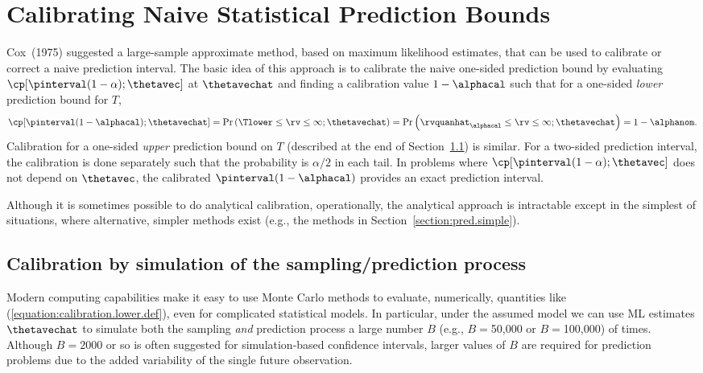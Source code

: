 \section{Calibrating Naive Statistical Prediction Bounds}
\label{section:calibrate.pred}
Cox~(1975) suggested a large-sample approximate method, based on
maximum likelihood estimates, that can be used to calibrate or
correct a naive prediction interval.  The basic idea of this
approach is to calibrate the naive one-sided prediction bound by
evaluating $\cp[\pinterval(1-\alpha) ;\thetavec]$ at $\thetavechat$
and finding a calibration value $1-\alphacal$ such that for a
one-sided {\em lower} prediction bound for $T$,
\begin{equation}
\label{equation:calibration.lower.def}
\cp[\pinterval(1-\alphacal) ;\thetavechat] =
\Pr \left(\Tlower \leq \rv \leq \infty ; \thetavechat \right)
= \Pr \left(\rvquanhat_{\alphacal} \leq \rv \leq \infty ;
\thetavechat \right) = 1-\alphanom.
\end{equation}
Calibration for a one-sided {\em upper} prediction bound on $T$
(described at the end of
Section~\ref{section:calibration.from.simulation}) is similar.  For
a two-sided prediction interval, the calibration is done separately such that
the probability is $\alpha/2$ in each tail.  In problems where
$\cp[\pinterval(1-\alpha);\thetavec]$ does not depend on
$\thetavec$, the calibrated $\pinterval(1-\alphacal)$ provides an exact
prediction interval.

Although it is sometimes possible to do analytical calibration,
operationally, the analytical approach is intractable except in the
simplest of situations, where alternative, simpler methods exist
(e.g., the methods in Section~\ref{section:pred.simple}).

\subsection{Calibration by simulation of the sampling/prediction process}
\label{section:calibration.from.simulation}
Modern computing capabilities make it easy to use Monte Carlo
methods to evaluate, numerically, quantities like
(\ref{equation:calibration.lower.def}), even for complicated
statistical models.  In particular, under the assumed model we can
use ML estimates $\thetavechat$ to simulate both the sampling {\em
and} prediction process a large number $B$ (e.g., $B=$50,000 or
$B=$100,000) of times.  Although $B=2000$ or so is often suggested
for simulation-based confidence intervals, larger values of $B$ are
required for prediction problems due to the added variability of the
single future observation.

